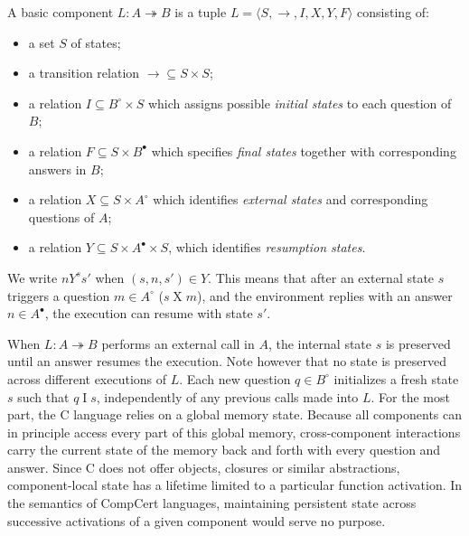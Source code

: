 \documentclass[acmsmall,screen,review,anonymous]{acmart}
\newcommand{\que}{\circ}
\newcommand{\ans}{\bullet}
\begin{document}
\begin{definition} \label{def:lts}
A basic component $L : A \twoheadrightarrow B$
is a tuple $L = \langle S, {\rightarrow}, I, X, Y, F \rangle$
consisting of:
\begin{itemize}
  \item a set $S$ of states;
  \item a transition relation ${\rightarrow} \subseteq S \times S$;
  \item a relation $I \subseteq B^\que \times S$
    which assigns possible \emph{initial states}
    to each question of $B$;
  \item a relation $F \subseteq S \times B^\ans$
    which specifies \emph{final states} together with
    corresponding answers in $B$;
  \item a relation $X \subseteq S \times A^\que$
    which identifies \emph{external states} and
    corresponding questions of $A$;
  \item a relation $Y \subseteq S \times A^\ans \times S$,
    which identifies \emph{resumption states}.
\end{itemize}
We write $n \mathrel{Y^s} s'$ when $(s, n, s') \in Y$.
This means that
after an external state $s$ triggers a question $m \in A^\que$ ($s \mathrel{X} m$),
and the environment replies with an answer $n \in A^\ans$,
the execution can resume with state $s'$.
\end{definition}

When $L : A \twoheadrightarrow B$
performs an external call in $A$,
the internal state $s$ is preserved
until an answer resumes the execution.
Note however that
no state is preserved across different executions of $L$.
Each new question $q \in B^\que$ initializes a fresh state $s$
such that $q \mathrel{I} s$,
independently of any previous calls made into $L$.
For the most part, the C language relies on a global memory state.
Because all components can in principle access every part of this global memory,
cross-component interactions carry the current state of the memory
back and forth with every question and answer.
Since C does not offer objects, closures or similar abstractions,
component-local state has a lifetime limited to a particular function activation.
In the semantics of CompCert languages,
maintaining persistent state across successive activations of a given component
would serve no purpose.
\end{document}
